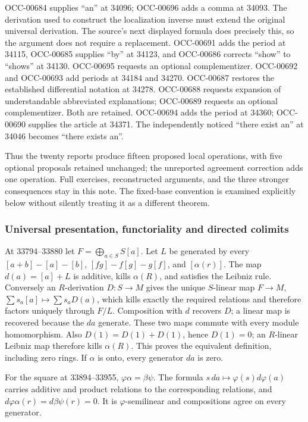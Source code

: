 OCC-00684 supplies ``an'' at 34096; OCC-00696 adds a comma at 34093. The derivation used to construct the localization inverse must extend the original universal derivation. The source's next displayed formula does precisely this, so the argument does not require a replacement. OCC-00691 adds the period at 34115, OCC-00685 supplies ``by'' at 34123, and OCC-00686 corrects ``show'' to ``shows'' at 34130. OCC-00695 requests an optional complementizer. OCC-00692 and OCC-00693 add periods at 34184 and 34270. OCC-00687 restores the established differential notation at 34278. OCC-00688 requests expansion of understandable abbreviated explanations; OCC-00689 requests an optional complementizer. Both are retained. OCC-00694 adds the period at 34360; OCC-00690 supplies the article at 34371. The independently noticed ``there exist an'' at 34046 becomes ``there exists an''.

Thus the twenty reports produce fifteen proposed local operations, with five optional proposals retained unchanged; the unreported agreement correction adds one operation. Full exercises, reconstructed arguments, and the three stronger consequences stay in this note. The fixed-base convention is examined explicitly below without silently treating it as a different theorem.

\subsubsection{Universal presentation, functoriality and directed colimits}\label{universal-presentation-functoriality-and-directed-colimits}

At 33794--33880 let \(F=\bigoplus_{a\in S}S[a]\). Let \(L\) be generated by every \([a+b]-[a]-[b]\), \([fg]-f[g]-g[f]\), and \([\alpha(r)]\). The map \(d(a)=[a]+L\) is additive, kills \(\alpha(R)\), and satisfies the Leibniz rule. Conversely an \(R\)-derivation \(D:S\to M\) gives the unique \(S\)-linear map \(F\to M\), \(\sum s_a[a]\mapsto\sum s_aD(a)\), which kills exactly the required relations and therefore factors uniquely through \(F/L\). Composition with \(d\) recovers \(D\); a linear map is recovered because the \(da\) generate. These two maps commute with every module homomorphism. Also \(D(1)=D(1)+D(1)\), hence \(D(1)=0\); an \(R\)-linear Leibniz map therefore kills \(\alpha(R)\). This proves the equivalent definition, including zero rings. If \(\alpha\) is onto, every generator \(da\) is zero.

For the square at 33894--33955, \(\varphi\alpha=\beta\psi\). The formula \(s\,da\mapsto\varphi(s)d\varphi(a)\) carries additive and product relations to the corresponding relations, and \(d\varphi\alpha(r)=d\beta\psi(r)=0\). It is \(\varphi\)-semilinear and compositions agree on every generator.

